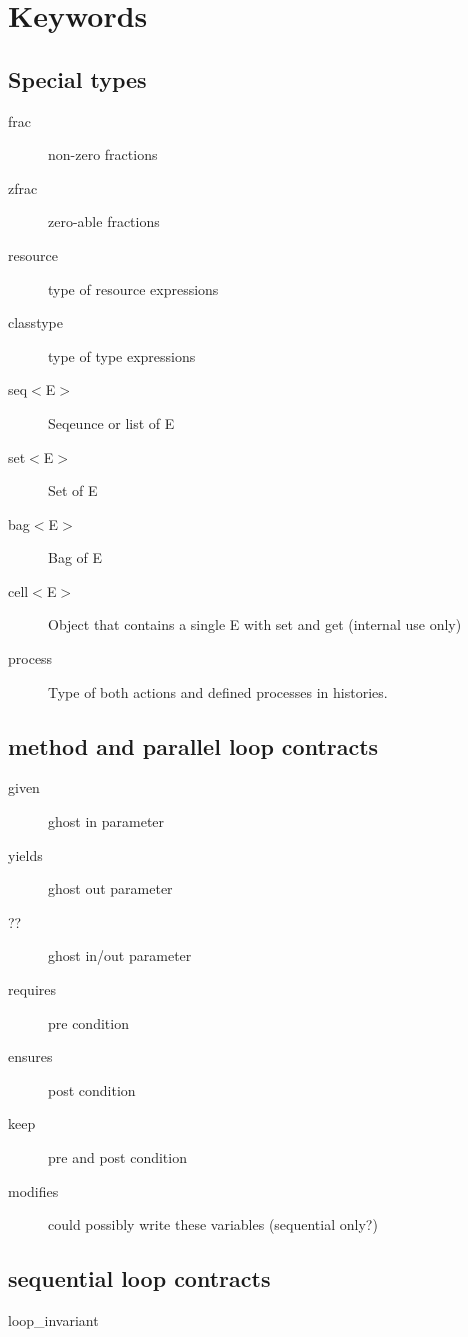 \chapter{Keywords}

\section*{Special types}
\begin{description}
\item[frac] non-zero fractions
\item[zfrac] zero-able fractions
\item[resource] type of resource expressions
\item[classtype] type of type expressions
\item[seq$<$E$>$] Seqeunce or list of E
\item[set$<$E$>$] Set of E
\item[bag$<$E$>$] Bag of E
\item[cell$<$E$>$] Object that contains a single E with set and get (internal use only)
\item[process] Type of both actions and defined processes in histories.
\end{description}

\section*{method and parallel loop contracts}

\begin{description}
\item[given] ghost in parameter
\item[yields] ghost out parameter
\item[??] ghost in/out parameter
\item[requires] pre condition
\item[ensures] post condition
\item[keep] pre and post condition
\item[modifies] could possibly write these variables (sequential only?)
\end{description}

\section*{sequential loop contracts}

\begin{description}
\item[loop\_invariant]
\end{description}


